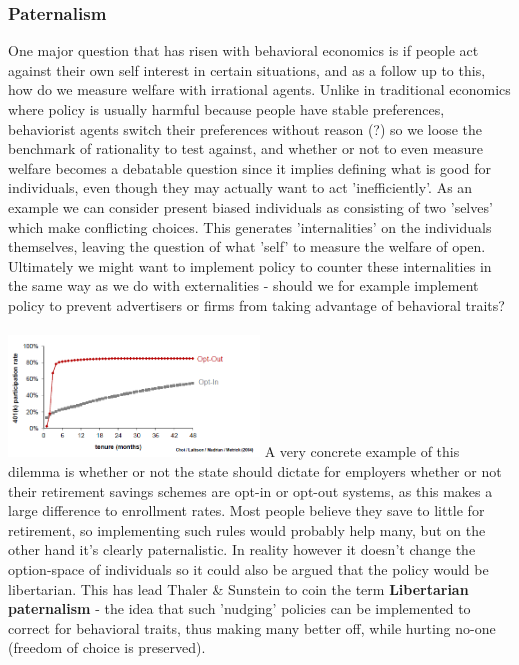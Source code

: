 \documentclass[12pt, a4paper]{article}
\begin{document}
\begin{multicols}{2}
\subsubsection{Paternalism}
One major question that has risen with behavioral economics is if people act against their own self interest in certain situations, and as a follow up to this, how do we measure welfare with irrational agents. Unlike in traditional economics where policy is usually harmful because people have stable preferences, behaviorist agents switch their preferences without reason (?) so we loose the benchmark of rationality to test against, and whether or not to even measure welfare becomes a debatable question since it implies defining what is good for individuals, even though they may actually want to act 'inefficiently'. As an example we can consider present biased individuals as consisting of two 'selves' which make conflicting choices. This generates 'internalities' on the individuals themselves, leaving the question of what 'self' to measure the welfare of open. Ultimately we might want to implement policy to counter these internalities in the same way as we do with externalities - should we for example implement policy to prevent advertisers or firms from taking advantage of behavioral traits?
\\ \\
\includegraphics[width = 0.5\textwidth]{optinoptout.PNG}
A very concrete example of this dilemma is whether or not the state should dictate for employers whether or not their retirement savings schemes are opt-in or opt-out systems, as this makes a large difference to enrollment rates. Most people believe they save to little for retirement, so implementing such rules would probably help many, but on the other hand it's clearly paternalistic. In reality however it doesn't change the option-space of individuals so it could also be argued that the policy would be libertarian. This has lead Thaler \& Sunstein to coin the term \textbf{Libertarian paternalism} - the idea that such 'nudging' policies can be implemented to correct for behavioral traits, thus making many better off, while hurting no-one (freedom of choice is preserved). 
\end{multicols}
\end{document}
